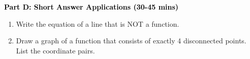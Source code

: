\documentclass[12pt, letterpaper, fleqn]{article}
\begin{document}
\newpage

\begin{tcolorbox}[colback=customteal!20]
\large\textcolor{black}{\textbf{Part D: Short Answer Applications (30-45 mins)}}
\end{tcolorbox}

\vspace{3mm}

\begin{enumerate}[itemsep=4.2cm, leftmargin=0.6cm, resume]
\item Write the equation of a line that is NOT a function.
\item Draw a graph of a function that consists of exactly 4 disconnected points. List the coordinate pairs.
\end{enumerate}
\end{document}
